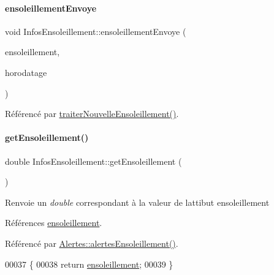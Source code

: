 \paragraph{\texorpdfstring{ensoleillement\+Envoye}{ensoleillementEnvoye}}
{\footnotesize\ttfamily void Infos\+Ensoleillement\+::ensoleillement\+Envoye (\begin{DoxyParamCaption}\item[{double}]{ensoleillement,  }\item[{Q\+String}]{horodatage }\end{DoxyParamCaption})\hspace{0.3cm}{\ttfamily [signal]}}



Référencé par \hyperlink{class_infos_ensoleillement_abe5426845614e3383e915dc9b3cacc3e}{traiter\+Nouvelle\+Ensoleillement()}.

\mbox{\label{class_infos_ensoleillement_a388dd7b2ae97839a779ca1384ca8e6e2}} 
\paragraph{\texorpdfstring{get\+Ensoleillement()}{getEnsoleillement()}}
{\footnotesize\ttfamily double Infos\+Ensoleillement\+::get\+Ensoleillement (\begin{DoxyParamCaption}{ }\end{DoxyParamCaption})}

\begin{DoxyReturn}{Renvoie}
un {\itshape double} correspondant à la valeur de l\textquotesingle{}attibut ensoleillement 
\end{DoxyReturn}


Références \hyperlink{class_infos_ensoleillement_a5f3ad64743e3beeb4e64c4555ec6155c}{ensoleillement}.



Référencé par \hyperlink{class_alertes_ae7ad960c530a6a7e82df3ed55d159a68}{Alertes\+::alertes\+Ensoleillement()}.


\begin{DoxyCode}
00037 \{
00038     \textcolor{keywordflow}{return} \hyperlink{class_infos_ensoleillement_a5f3ad64743e3beeb4e64c4555ec6155c}{ensoleillement};
00039 \}
\end{DoxyCode}
\mbox{\label{class_infos_ensoleillement_a0bd39540c8b4a242ea378c91bbc58b89}} 
